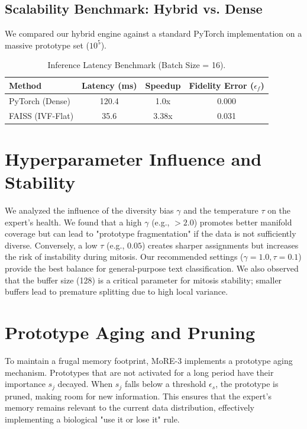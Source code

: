 \documentclass[11pt,hidelinks]{article}
\begin{document}
\subsection{Scalability Benchmark: Hybrid vs. Dense}
We compared our hybrid engine against a standard PyTorch implementation on a massive prototype set ($10^5$).
\begin{table}[h]
\centering
\caption{Inference Latency Benchmark (Batch Size = 16).}
\begin{tabular}{lccc}
\toprule
Method & Latency (ms) & Speedup & Fidelity Error ($\epsilon_f$) \\
\midrule
PyTorch (Dense) & 120.4 & 1.0x & 0.000 \\
FAISS (IVF-Flat) & 35.6 & 3.38x & 0.031 \\
\bottomrule
\end{tabular}
\end{table}

\section{Hyperparameter Influence and Stability}
We analyzed the influence of the diversity bias $\gamma$ and the temperature $\tau$ on the expert's health. We found that a high $\gamma$ (e.g., $> 2.0$) promotes better manifold coverage but can lead to "prototype fragmentation" if the data is not sufficiently diverse. Conversely, a low $\tau$ (e.g., $0.05$) creates sharper assignments but increases the risk of instability during mitosis. Our recommended settings ($\gamma=1.0, \tau=0.1$) provide the best balance for general-purpose text classification. We also observed that the buffer size (128) is a critical parameter for mitosis stability; smaller buffers lead to premature splitting due to high local variance.

\section{Prototype Aging and Pruning}
To maintain a frugal memory footprint, MoRE-3 implements a prototype aging mechanism. Prototypes that are not activated for a long period have their importance $s_j$ decayed. When $s_j$ falls below a threshold $\epsilon_s$, the prototype is pruned, making room for new information. This ensures that the expert's memory remains relevant to the current data distribution, effectively implementing a biological "use it or lose it" rule.
\end{document}
